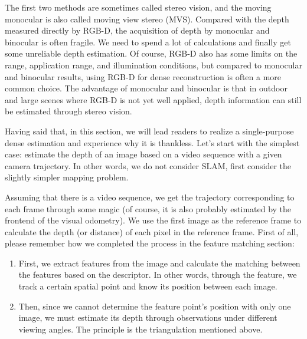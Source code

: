 The first two methods are sometimes called stereo vision, and the moving monocular is also called moving view stereo (MVS). Compared with the depth measured directly by RGB-D, the acquisition of depth by monocular and binocular is often fragile. We need to spend a lot of calculations and finally get some unreliable depth estimation. Of course, RGB-D also has some limits on the range, application range, and illumination conditions, but compared to monocular and binocular results, using RGB-D for dense reconstruction is often a more common choice. The advantage of monocular and binocular is that in outdoor and large scenes where RGB-D is not yet well applied, depth information can still be estimated through stereo vision.

Having said that, in this section, we will lead readers to realize a single-purpose dense estimation and experience why it is thankless. Let's start with the simplest case: estimate the depth of an image based on a video sequence with a given camera trajectory. In other words, we do not consider SLAM, first consider the slightly simpler mapping problem.

Assuming that there is a video sequence, we get the trajectory corresponding to each frame through some magic (of course, it is also probably estimated by the frontend of the visual odometry). We use the first image as the reference frame to calculate the depth (or distance) of each pixel in the reference frame. First of all, please remember how we completed the process in the feature matching section:

\begin{enumerate}
	\item First, we extract features from the image and calculate the matching between the features based on the descriptor. In other words, through the feature, we track a certain spatial point and know its position between each image.
	\item Then, since we cannot determine the feature point's position with only one image, we must estimate its depth through observations under different viewing angles. The principle is the triangulation mentioned above.
\end{enumerate}

